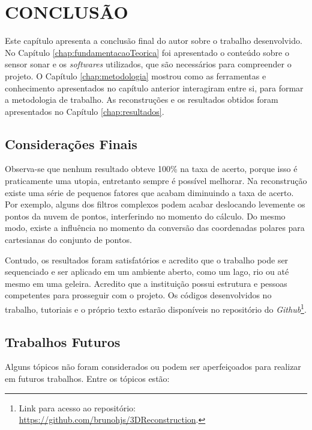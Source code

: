 
\chapter{CONCLUSÃO}
\label{chap:conclusao}

Este capítulo apresenta a conclusão final do autor sobre o trabalho desenvolvido.
No Capítulo \ref{chap:fundamentacaoTeorica} foi apresentado o conteúdo sobre o sensor sonar e os \textit{softwares} utilizados, que são necessários para compreender o projeto.
O Capítulo \ref{chap:metodologia} mostrou como as ferramentas e conhecimento apresentados no capítulo anterior interagiram entre si, para formar a metodologia de trabalho.
As reconstruções e os resultados obtidos foram apresentados no Capítulo \ref{chap:resultados}.


\section{Considerações Finais}
\label{sec:consideracoes_finais}

Observa-se que nenhum resultado obteve 100\% na taxa de acerto, porque isso é praticamente uma utopia, entretanto sempre é possível melhorar.
Na reconstrução existe uma série de pequenos fatores que acabam diminuindo a taxa de acerto.
Por exemplo, alguns dos filtros complexos podem acabar deslocando levemente os pontos da nuvem de pontos, interferindo no momento do cálculo.
Do mesmo modo, existe a influência no momento da conversão das coordenadas polares para cartesianas do conjunto de pontos.

Contudo, os resultados foram satisfatórios e acredito que o trabalho pode ser sequenciado e ser aplicado em um ambiente aberto, como um lago, rio ou até mesmo em uma geleira.
Acredito que a instituição possui estrutura e pessoas competentes para prosseguir com o projeto.
Os códigos desenvolvidos no trabalho, tutoriais e o próprio texto  estarão disponíveis no repositório do \textit{Github}\footnote{Link para acesso ao repositório: \url{https://github.com/brunohjs/3DReconstruction}.}.


\section{Trabalhos Futuros}
\label{sec:trabalhos_futuros}

Alguns tópicos não foram considerados ou podem ser aperfeiçoados para realizar em futuros trabalhos. Entre os tópicos estão:


